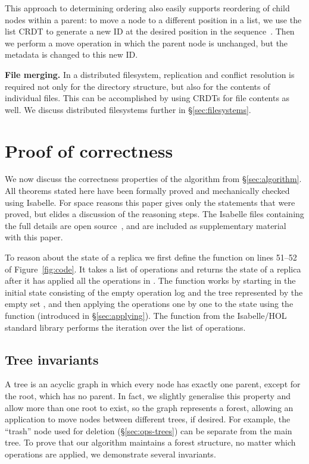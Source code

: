 \documentclass[10pt,journal,compsoc]{IEEEtran}
\begin{document}
This approach to determining ordering also easily supports reordering of child nodes within a parent: to move a node to a different position in a list, we use the list CRDT to generate a new ID at the desired position in the sequence~\cite{Kleppmann:2020jw}.
Then we perform a move operation in which the parent node is unchanged, but the metadata is changed to this new ID.

\smallbreak\noindent\textbf{File merging.}
In a distributed filesystem, replication and conflict resolution is required not only for the directory structure, but also for the contents of individual files.
This can be accomplished by using CRDTs for file contents as well.
We discuss distributed filesystems further in \S\ref{sec:filesystems}.

\section{Proof of correctness}\label{sec:proof}

We now discuss the correctness properties of the algorithm from \S\ref{sec:algorithm}.
All theorems stated here have been formally proved and mechanically checked using Isabelle.
For space reasons this paper gives only the statements that were proved, but elides a discussion of the reasoning steps.
The Isabelle files containing the full details are open source~\cite{SourceFiles}, and are included as supplementary material with this paper.

To reason about the state of a replica we first define the function  on lines 51--52 of Figure~\ref{fig:code}.
It takes a list of operations  and returns the state of a replica after it has applied all the operations in .
The  function works by starting in the initial state \isa{([], \{\})} consisting of the empty operation log \isa{[]} and the tree represented by the empty set \isa{\{\}}, and then applying the operations one by one to the state using the  function (introduced in \S\ref{sec:applying}).
The  function from the Isabelle/HOL standard library performs the iteration over the list of operations.

\subsection{Tree invariants}\label{sec:tree-invariants}

A tree is an acyclic graph in which every node has exactly one parent, except for the root, which has no parent.
In fact, we slightly generalise this property and allow more than one root to exist, so the graph represents a forest, allowing an application to move nodes between different trees, if desired.
For example, the ``trash'' node used for deletion (\S\ref{sec:ops-trees}) can be separate from the main tree.
To prove that our algorithm maintains a forest structure, no matter which operations are applied, we demonstrate several invariants.
\end{document}
